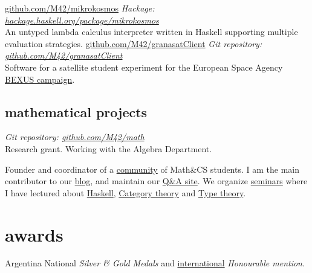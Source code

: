 \documentclass[]{friggeri-cv-a4}
\begin{document}
\begin{entrylist}
{\href{https://github.com/M42/mikrokosmos}{github.com/M42/mikrokosmos}}
{\emph{Hackage: \href{https://hackage.haskell.org/package/mikrokosmos}{hackage.haskell.org/package/mikrokosmos}} \\
  An untyped lambda calculus interpreter written in Haskell supporting multiple evaluation strategies.
}
{\href{https://github.com/M42/granasatClient}{github.com/M42/granasatClient}}
{\emph{Git repository: \href{https://github.com/M42/granasatClient}{github.com/M42/granasatClient}} \\
  Software for a satellite student experiment for the
  European Space Agency \href{http://rexusbexus.net/}{BEXUS campaign}.
}
\end{entrylist}

\subsection{mathematical projects}

\begin{entrylist}
{\emph{Git repository: \href{https://github.com/M42/math}{github.com/M42/math}} \\
  Research grant. Working with the Algebra Department.}

{ Founder and coordinator of a \href{http://tux.ugr.es/dgiim/}{community} of Math\&CS students.
  I am the main contributor to our \href{http://tux.ugr.es/dgiim/blog/}{blog},
  and maintain our \href{http://tux.ugr.es/dgiim/overflow/}{Q\&A site}.
  We organize \href{http://tux.ugr.es/dgiim/awesome/seminars/}{seminars} where I have lectured about
  \href{https://github.com/libreim/introHaskell/blob/master/introHaskell.pdf}{Haskell},
  \href{https://github.com/libreim/introCategorias/blob/master/categorias.pdf}{Category theory}
  and \href{https://github.com/libreim/curryHoward/blob/master/CurryHoward.pdf}{Type theory}.
}
\end{entrylist}


\section{awards}

\begin{entrylist}

{Argentina}
{National \emph{Silver \& Gold Medals} and
\href{https://www.imo-official.org/team_r.aspx?code=ESP&year=2012}{international} \emph{Honourable mention}.}

\end{entrylist}
\end{document}
